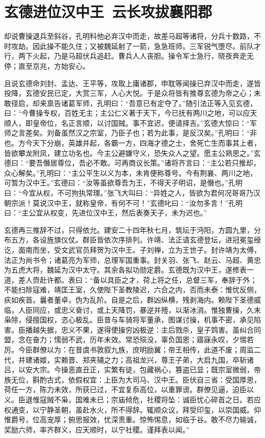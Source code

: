 \chapter{玄德进位汉中王~云长攻拔襄阳郡}

却说曹操退兵至斜谷，孔明料他必弃汉中而走，故差马超等诸将，分兵十数路，不时攻劫。因此操不能久住；又被魏延射了一箭，急急班师。三军锐气堕尽。前队才行，两下火起，乃是马超伏兵追赶。曹兵人人丧胆。操令军士急行，晓夜奔走无停；直至京兆，方始安心。

且说玄德命刘封、孟达、王平等，攻取上庸诸郡，申耽等闻操已弃汉中而走，遂皆投降，玄德安民已定，大赏三军，人心大悦。于是众将皆有推尊玄德为帝之心；未敢径启，却来禀告诸葛军师，孔明曰：“吾意已有定夺了。”随引法正等入见玄德，曰：“今曹操专权，百姓无主；主公仁义著于天下，今已抚有两川之地，可以应天顺人，即皇帝位，名正言顺，以讨国贼。事不宜迟，便请择吉。”玄德大惊曰：“军师之言差矣。刘备虽然汉之宗室，乃臣子也；若为此事，是反汉矣。”孔明曰：“非也。方今天下分崩，英雄并起，各霸一方，四海才德之士，舍死亡生而事其上者，皆欲攀龙附凤，建立功名也。今主公避嫌守义，恐失众人之望。愿主公熟思之。”玄德曰：“要吾僭居尊位，吾必不敢。可再商议长策。”诸将齐言曰：“主公若只推却，众心解矣。”孔明曰：“主公平生以义为本，未肯便称尊号。今有荆襄、两川之地，可暂为汉中王。”玄德曰：“汝等虽欲尊吾为王，不得天子明诏，是僭也。”孔明曰：“今宜从权，不可拘执常理。”张飞大叫曰：“异姓之人，皆欲为君何况哥哥乃汉朝宗派！莫说汉中王，就称皇帝，有何不可！”玄德叱曰：“汝勿多言！”孔明曰：“主公宜从权变，先进位汉中王，然后表奏天子，未为迟也。”

玄德再三推辞不过，只得依允。建安二十四年秋七月，筑坛于沔阳，方圆九里，分布五方，各设旌旗仪仗。群臣皆依次序排列。许靖、法正请玄德登坛，进冠冕玺绶讫，面南而坐，受文武官员拜贺为汉中王。子刘禅，立为王世子。封许靖为太傅，法正为尚书令；诸葛亮为军师，总理军国重事。封关羽、张飞、赵云、马超、黄忠为五虎大将，魏延为汉中太守。其余各拟功勋定爵。玄德既为汉中王，遂修表一道，差人赍赴许都。表曰：“备以具臣之才，荷上将之任，总督三军，奉辞于外；不能扫除寇难，靖匡王室，久使陛下圣教陵迟，六合之内，否而未泰：惟忧反侧，疢如疾首。曩者董卓，伪为乱阶。自是之后，群凶纵横，残剥海内。赖陛下圣德威临，人臣同应，或忠义奋讨，或上天降罚，暴逆并殪，以渐冰消。惟独曹操，久未枭除，侵擅国权，恣心极乱。臣昔与车骑将军董承，图谋讨操，机事不密，承见陷害。臣播越失据，忠义不果，遂得使操穷凶极逆：主后戮杀，皇子鸩害。虽纠合同盟，念在奋力；懦弱不武，历年未效。常恐殒没，辜负国恩；寤寐永叹，夕惕若厉。今臣群僚以为：在昔虞书敦叙九族，庶明励翼；帝王相传，此道不废；周监二代，并建诸姬，实赖晋、郑夹辅之力；高祖龙兴，尊王子弟，大启九国，卒斩诸吕，以安大宗。今操恶直丑正，实繁有徒，包藏祸心，篡盗已显；既宗室微弱，帝族无位，斟酌古式，依假权宜：上臣为大司马、汉中王。臣伏自三省：受国厚恩，荷任一方，陈力未效，所获已过，不宜复忝高位，以重罪谤。群僚见逼，迫臣以义。臣退惟寇贼不枭，国难未已；宗庙倾危，社稷将坠：诚臣忧心碎首之日。若应权通变，以宁静圣朝，虽赴水火，所不得辞。辄顺众议，拜受印玺，以崇国威。仰惟爵号，位高宠厚；俯思报效，忧深责重。惊怖惕息，如临于谷。敢不尽力输诚，奖励六师，率齐群义，应天顺时，以宁社稷。谨拜表以闻。”


